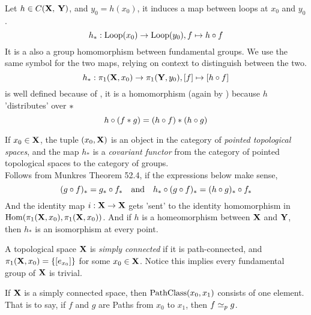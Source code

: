 \documentclass[../main-manifolds.tex]{subfiles}
\begin{document}
\begin{definition}\label{munkres:homomorphism-induced-by-continuous-map}
    Let $h\in C({\mathbf{X}},\: {\mathbf{Y}})$, and $y_0 = h(x_0)$, it induces a map between loops at $x_0$ and $y_0$. 
    \[
        h_*:\Loop[x_0]\to\Loop[y_0], f\mapsto h\circ f
    \]
    It is a also a group homomorphism between fundamental groups. We use the same symbol for the two maps, relying on context to distinguish between the two.
    \[
        h_*:\pi_{1}({{\mathbf{X}}},{x_0})\to\pi_{1}({{\mathbf{Y}}},{y_0}),[f]\mapsto [h\circ f]
    \]
    is well defined because of , it is a homomorphism (again by ) because $h$ 'distributes' over $\ast$
    \[
        h\circ (f\ast g)=(h\circ f)\ast (h\circ g)
    \]
\end{definition}
\begin{remark}
    If $x_0\in{\mathbf{X}}$, the tuple $(x_0, {\mathbf{X}})$ is an object in the category of \emph{pointed topological spaces}, and the map $h_*$ is a \emph{covariant functor} from the category of pointed topological spaces to the category of groups.\\

    Follows from Munkres Theorem 52.4, if the expressions below make sense,
    \[
        (g\circ f)_* = g_*\circ f_*\qqtext{and}  h_*\circ (g\circ f)_* = (h\circ g)_*\circ f_*
    \]
    And the identity map $i:{\mathbf{X}}\to{\mathbf{X}}$ gets 'sent' to the identity homomorphism in $\Hom[\fgroup{\xx}{x_0},\fgroup{\xx}{x_0}]$. And if $h$ is a homeomorphism between ${\mathbf{X}}$ and ${\mathbf{Y}}$, then $h_*$ is an isomorphism at every point.
\end{remark}


\begin{definition}\label{munkres:simply-connected}
    A topological space ${\mathbf{X}}$ is \emph{simply connected} if it is path-connected, and $\pi_{1}({{\mathbf{X}}},{x_0})=\{[e_{x_0}]\}$ for some $x_0\in {\mathbf{X}}$. Notice this implies every fundamental group of ${\mathbf{X}}$ is trivial.
\end{definition}
\begin{wts}
    If ${\mathbf{X}}$ is a simply connected space, then $\PathClass[x_0,x_1]$ consists of one element. That is to say, if $f$ and $g$ are Paths from $x_0$ to $x_1$, then $f\simeq_p g$.
\end{wts}

\begin{definition}\label{munkres:covering-maps-spaces}
    
\end{definition}
\end{document}
